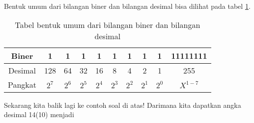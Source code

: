 \documentclass{article}
\begin{document}
Bentuk umum dari bilangan biner dan bilangan desimal bisa dilihat pada tabel \ref{table:binerdesimal}. 

\begin{table}[h!]
\centering
\begin{tabular}{ |c|c|c|c|c|c|c|c|c|c| } 
\hline
Biner & 1 & 1 & 1 & 1 & 1 & 1 & 1 & 1 & 11111111 \\ 
\hline
Desimal & 128 & 64 & 32 & 16 & 8 & 4 & 2 & 1 & 255 \\ 
\hline
Pangkat & $2^7$ & $2^6$ & $2^5$ & $2^4$ & $2^3$ & $2^2$ & $2^1$ & $2^0$ & $X^{1-7}$ \\ 
\hline
\end{tabular}
\caption{Tabel bentuk umum dari bilangan biner dan bilangan desimal}
\label{table:binerdesimal}
\end{table}
Sekarang kita balik lagi ke contoh soal di atas! Darimana kita dapatkan angka desimal 14(10) menjadi 







\end{document}
